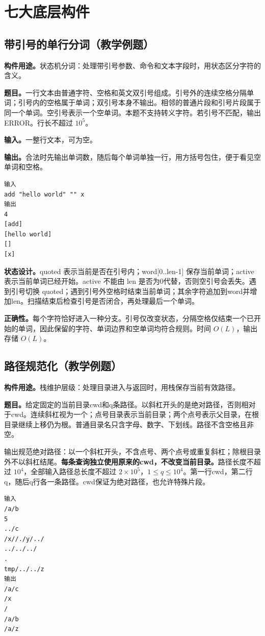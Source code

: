 \section{七大底层构件}
\subsection{带引号的单行分词（教学例题）}
\noindent\textbf{构件用途。}状态机分词：处理带引号参数、命令和文本字段时，用状态区分字符的含义。


\noindent\textbf{题目。}一行文本由普通字符、空格和英文双引号组成。引号外的连续空格分隔单词；引号内的空格属于单词；双引号本身不输出。相邻的普通片段和引号片段属于同一个单词。空引号表示一个空单词。本题不支持转义字符。若引号不匹配，输出 ERROR。行长不超过 $10^5$。

\noindent\textbf{输入。}一整行文本，可为空。

\noindent\textbf{输出。}合法时先输出单词数，随后每个单词单独一行，用方括号包住，便于看见空单词和空格。
\begin{verbatim}
输入
add "hello world" "" x
输出
4
[add]
[hello world]
[]
[x]
\end{verbatim}

\noindent\textbf{状态设计。}quoted 表示当前是否在引号内；word[0..len-1] 保存当前单词；active 表示当前单词已经开始。active 不能由 len 是否为0代替，否则空引号会丢失。遇到引号切换 quoted；遇到引号外空格时结束当前单词；其余字符追加到word并增加len。扫描结束后检查引号是否闭合，再处理最后一个单词。

\noindent\textbf{正确性。}每个字符恰好进入一种分支。引号仅改变状态，分隔空格仅结束一个已开始的单词，因此保留的字符、单词边界和空单词均符合规则。时间 $O(L)$，输出存储 $O(L)$。

\subsection{路径规范化（教学例题）}
\noindent\textbf{构件用途。}栈维护层级：处理目录进入与返回时，用栈保存当前有效路径。


\noindent\textbf{题目。}给定固定的当前目录cwd和q条路径。以斜杠开头的是绝对路径，否则相对于cwd。连续斜杠视为一个；点号目录表示当前目录；两个点号表示父目录，在根目录继续上移仍为根。普通目录名只含字母、数字、下划线。路径不含空格且非空。

输出规范绝对路径：以一个斜杠开头，不含点号、两个点号或重复斜杠；除根目录外不以斜杠结尾。\textbf{每条查询独立使用原来的cwd，不改变当前目录。}路径长度不超过 $10^4$，全部输入路径总长度不超过 $2\times10^5$，$1\le q\le10^4$。第一行cwd，第二行q，随后q行各一条路径。cwd保证为绝对路径，也允许特殊片段。
\begin{verbatim}
输入
/a/b
5
../c
/x//./y/../
../../../
.
tmp/../../z
输出
/a/c
/x
/
/a/b
/a/z
\end{verbatim}

